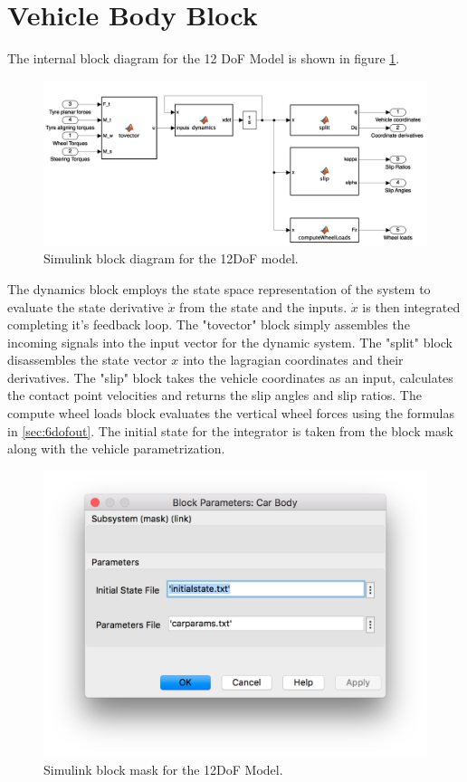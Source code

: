 \section{Vehicle Body Block}
\label{sec:bodyblock}
The internal block diagram for the 12 DoF Model is shown in figure \ref{12diag}.
\begin{figure}[ht]
  \centering
  \includegraphics[width=\textwidth]{images/12dofinside.png}
  \caption{Simulink block diagram for the 12DoF model.}
  \label{12diag}
\end{figure}
The dynamics block employs the state space representation of the system to evaluate the state derivative $\dot x$ from the state and the inputs. $\dot x$ is then integrated completing it's feedback loop.
The "tovector" block simply assembles the incoming signals into the input vector for the dynamic system. The "split" block disassembles the state vector $x$ into the lagragian coordinates and their derivatives.
The "slip" block takes the vehicle coordinates as an input, calculates the contact point velocities and returns the slip angles and slip ratios.
The compute wheel loads block evaluates the vertical wheel forces using the formulas in \ref{sec:6dofout}.
The initial state for the integrator is taken from the block mask along with the vehicle parametrization.

\begin{figure}[ht]
  \centering
  \includegraphics[width=\textwidth]{images/bodymask.png}
  \caption{Simulink block mask for the 12DoF Model.}
\end{figure}

